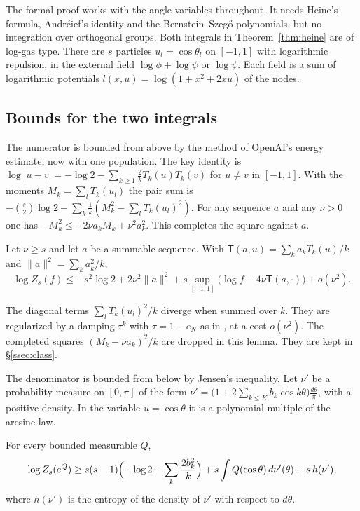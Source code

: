 The formal proof works with the angle variables throughout. It needs Heine's formula, Andr\'eief's identity
and the Bernstein--Szeg\H{o} polynomials, but no integration over orthogonal groups. Both integrals in
Theorem~\ref{thm:heine} are of log-gas type. There are $s$ particles $u_l=\cos\theta_l$ on $[-1,1]$ with
logarithmic repulsion, in the external field $\log\phi+\log\psi$ or $\log\psi$. Each field is a sum of
logarithmic potentials $l(x,u)=\log(1+x^2+2xu)$ of the nodes.

\subsection{Bounds for the two integrals}\label{ssec:loggas}
The numerator is bounded from above by the method of OpenAI's energy estimate, now with one population. The
key identity is $\log|u-v|=-\log2-\sum_{k\ge1}\frac2kT_k(u)T_k(v)$ for $u\ne v$ in $[-1,1]$. With the moments
$M_k=\sum_lT_k(u_l)$ the pair sum is $-\binom s2\log2-\sum_k\frac1k(M_k^2-\sum_lT_k(u_l)^2)$. For any sequence
$a$ and any $\nu>0$ one has $-M_k^2\le-2\nu a_kM_k+\nu^2a_k^2$. This completes the square against $a$.

\begin{lemma}\label{lem:LGup}
Let $\nu\ge s$ and let $a$ be a summable sequence. With $\mathsf T(a,u)=\sum_ka_kT_k(u)/k$ and
$\|a\|^2=\sum_ka_k^2/k$,
\[
 \log Z_s(f)\le-s^2\log2+2\nu^2\|a\|^2+s\sup_{[-1,1]}\bigl(\log f-4\nu\mathsf T(a,\cdot)\bigr)+o(\nu^2).
\]
\end{lemma}

The diagonal terms $\sum_lT_k(u_l)^2/k$ diverge when summed over $k$. They are regularized by a damping
$\tau^k$ with $\tau=1-e_N$ as in \cite[Prop.~6.1]{OpenAI2026}, at a cost $o(\nu^2)$. The completed squares
$(M_k-\nu a_k)^2/k$ are dropped in this lemma. They are kept in \S\ref{ssec:class}.

The denominator is bounded from below by Jensen's inequality. Let $\nu'$ be a probability measure on $[0,\pi]$
of the form $\nu'=\bigl(1+2\sum_{k\le K}b_k\cos k\theta\bigr)\frac{d\theta}\pi$, with a positive density. In the
variable $u=\cos\theta$ it is a polynomial multiple of the arcsine law.

\begin{lemma}\label{lem:LGlow}
For every bounded measurable $Q$,
\[
 \log Z_s(e^Q)\ge s(s-1)\Bigl(-\log2-\sum_k\frac{2b_k^2}k\Bigr)+s\int Q(\cos\theta)\,d\nu'(\theta)+s\,h(\nu'),
\]
where $h(\nu')$ is the entropy of the density of $\nu'$ with respect to $d\theta$.
\end{lemma}

